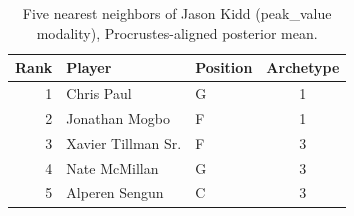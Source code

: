 \begin{table}[htbp]
  \centering\small
  \begin{tabular}{rllc}
    \toprule
    Rank & Player & Position & Archetype \\
    \midrule
    1 & Chris Paul & G & 1 \\
    2 & Jonathan Mogbo & F & 1 \\
    3 & Xavier Tillman Sr. & F & 3 \\
    4 & Nate McMillan & G & 3 \\
    5 & Alperen Sengun & C & 3 \\
    \bottomrule
  \end{tabular}
  \caption{Five nearest neighbors of Jason Kidd (peak_value modality), Procrustes-aligned posterior mean.}
  \label{tab:Jason_Kidd_neighbors_peak_value}
\end{table}


